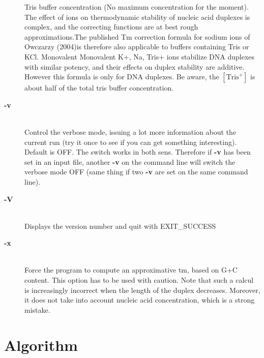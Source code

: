 \documentclass{article}
\begin{document}
\begin{description}
Tris buffer  concentration  (No maximum concentration for the moment). 
The effect  of  ions  on  thermodynamic  stability  of nucleic  acid 
duplexes is complex, and the correcting functions are  at  best
rough  approximations.The published  Tm  correction formula for sodium ions of 
Owczarzy (2004)is therefore also applicable to buffers containing Tris or
KCl. Monovalent Monovalent K+, Na, Tris+ ions  stabilize  DNA duplexes with similar potency, and 
their effects on duplex stability are additive. However this formula is only for DNA 
duplexes. Be aware, the $[\mbox{Tris}^+]$ is about half of the total tris buffer
concentration.
\item [\textbf{-v}  ]\mbox{}\\ 
Control the verbose 
mode, issuing a lot more information about the current run  (try it once 
to see if you can get something interesting). Default is OFF. The  switch 
works in both sens. Therefore if  \textbf{-v } has been set in an input file, another 
\textbf{-v } on the command line will switch the verbose mode OFF (same thing if 
two  \textbf{-v } are set on the same command line).  
\item [\textbf{-V}  ]\mbox{}\\ 
Displays the version number 
and quit with EXIT\_SUCCESS 
\item [\textbf{-x}  ]\mbox{}\\ Force the program to compute an approximative 
tm, based on G+C content. This option has to be used with caution. Note 
that such a calcul is increasingly incorrect when the length of  the duplex 
decreases. Moreover, it does not take into account nucleic acid concentration, 
which is a strong mistake.    
  
\end{description}
 
\section{Algorithm }
  
   
\end{document}
